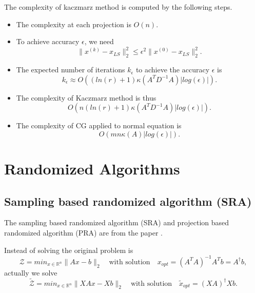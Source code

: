 The complexity of kaczmarz method is computed by the following steps.
\begin{itemize}
\item The complexity at each projection is {\color{red} $O(n)$}.
\item To achieve accuracy $\epsilon$, we need
$$\| x^{(k)} - x_{LS} \|_2^2 \leq \epsilon^2 \| x^{(0)} - x_{LS} \|_2^2.$$
\item The expected number of iterations $k_{\epsilon}$ to achieve the accuracy $\epsilon$ is
{\color{red}$$  k_{\epsilon} \approx O ((ln(r)+1) \kappa(A^TD^{-1}A) | log(\epsilon)| ). $$}
\item The complexity of  Kaczmarz method is thus
{\color{red}
$$  O (n (ln(r)+1) \kappa(A^TD^{-1}A) | log(\epsilon)| ). $$}
\item The complexity of CG applied to normal equation is
{\color{red}
$$
O(m n \kappa(A) |log(\epsilon)|).
$$
}
\end{itemize}

\section{Randomized Algorithms}
\subsection{Sampling based randomized algorithm (SRA)}
The sampling based randomized algorithm (SRA) and projection based randomized algorithm (PRA) are from the paper \cite{FLSA2011}.

Instead of solving the original problem is
\begin{equation}\label{ORG}
\mathcal{Z} = min_{x \in \mathbb{R}^n} \| Ax - b\|_2
\quad \text{with solution} \quad
x_{opt} = (A^T A)^{-1} A^T b = A^{\dagger} b,
\end{equation}
actually we solve
\begin{equation}\label{ACT}
\tilde{\mathcal{Z}} = min_{x \in \mathbb{R}^n} \| X Ax - X b\|_2
\quad \text{with solution} \quad
\tilde{x}_{opt} = (XA)^{\dagger} X b.
\end{equation}


